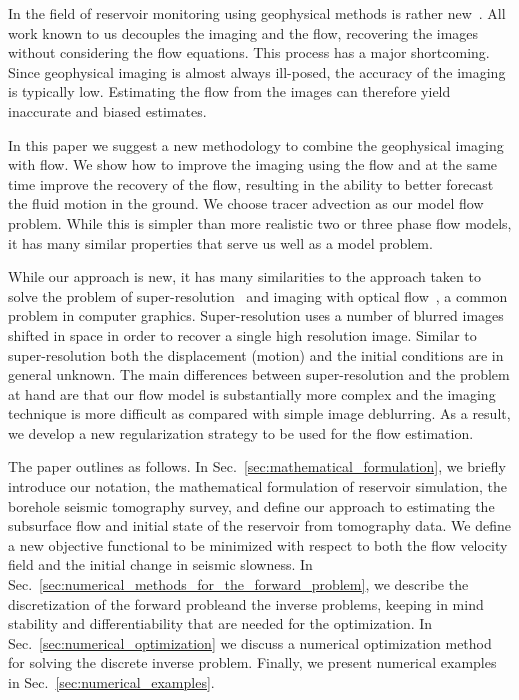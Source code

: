 \documentclass[english]{siamltex}
\begin{document}
In the field of reservoir monitoring using geophysical
methods is rather new~\cite{FahimuddinPhd,GosselinEtAl,NennaEtAl2011,MezghaniEtAl,EmerickReynolds12,TraniPhd}. 
All work known to us decouples the imaging and the flow, recovering the images without considering
the flow equations.
This process has a
major shortcoming. Since geophysical imaging is almost always
ill-posed, the accuracy of the imaging is typically low. Estimating the
flow from the images can therefore yield inaccurate 
and biased estimates.

In this paper we suggest a new methodology to combine the geophysical imaging
with flow. We  show how to improve the imaging using the flow and at the
same time improve the recovery of the flow, resulting in the  ability to better forecast
the fluid motion in the ground.
We choose  tracer advection as our model flow problem. 
While this is simpler than more realistic two or three phase flow models, it has many similar properties
that serve us well as a model problem.


 
While our approach is new, it has many similarities to the
approach taken to solve the problem of super-resolution~\cite{CHN06} and imaging with optical flow~\cite{BruneMaurerWagner2009}, a common problem in computer graphics. Super-resolution uses
a number of blurred images  shifted in space 
in order to recover a single high resolution image. 
Similar to super-resolution both the displacement (motion) and
the initial conditions are in general unknown. The main differences
between super-resolution and the problem at hand are that
our flow model is substantially more complex and the imaging
technique is more difficult as compared with simple image deblurring.
As a result, we develop a  new regularization strategy to be used for
the flow estimation.


\medskip

The paper outlines as follows. In Sec.~\ref{sec:mathematical_formulation}, we  briefly introduce our notation, the mathematical formulation of reservoir simulation, the borehole seismic tomography survey, and define our approach to estimating the subsurface flow and initial state of the reservoir from tomography data.
We define a new objective functional to be minimized with respect to both the flow velocity field and the initial change in seismic slowness.
In Sec.~\ref{sec:numerical_methods_for_the_forward_problem}, we describe the discretization of the
forward probleand the inverse problems, keeping in mind stability and differentiability that are needed for the optimization.
In Sec.~\ref{sec:numerical_optimization} we discuss a numerical optimization method for solving the discrete inverse problem. 
Finally, we present numerical examples in Sec.~\ref{sec:numerical_examples}.
\end{document}
